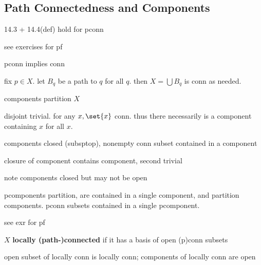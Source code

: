 \subsection{Path Connectedness and Components}

\begin{prop}
    14.3 + 14.4(def) hold for pconn
\end{prop}

see exercises for pf

\begin{prop}
    pconn implies conn
\end{prop}

\begin{pf}[source=Primary Source Material]
    fix $p\in X$.
    let $B_{q}$ be a path to $q$ for all $q$.
    then $X=\bigcup B_{q}$ is conn as needed.
\end{pf}

\begin{prop}
    components partition $X$
\end{prop}

\begin{pf}[source=Primary Source Material]
    disjoint trivial. for any $x,\set{x}$ conn.
    thus there necessarily is a component containing $x$ for all $x$.
\end{pf}

\begin{prop}
    components closed (subsptop), nonempty conn subset contained in a component
\end{prop}

\begin{pf}[source=Primary Source Material]
    closure of component contains component, second trivial
\end{pf}
note components closed but may not be open

\begin{prop}
    pcomponents partition, are contained in a single component, and
    partition components. pconn subsets contained in a single pcomponent.
\end{prop}
see exr for pf

\begin{defn}
    $X$ \textbf{locally (path-)connected} if it has a basis of open (p)conn
    subsets
\end{defn}

\begin{prop}
    open subset of locally conn is locally conn;
    components of locally conn are open
\end{prop}

